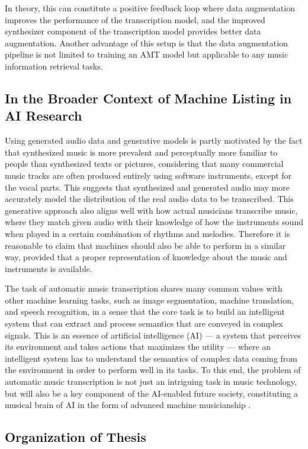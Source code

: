 In theory, this can constitute a positive feedback loop where data augmentation improves the performance of the transcription model, and the improved synthesizer component of the transcription model provides better data augmentation.
Another advantage of this setup is that the data augmentation pipeline is not limited to training an AMT model but applicable to any music information retrieval tasks.

\subsection{In the Broader Context of Machine Listing in AI Research}

Using generated audio data and generative models is partly motivated by the fact that synthesized music is more prevalent and perceptually more familiar to people than synthesized texts or pictures, considering that many commercial music tracks are often produced entirely using software instruments, except for the vocal parts.
This suggests that synthesized and generated audio may more accurately model the distribution of the real audio data to be transcribed.
This generative approach also aligns well with how actual musicians transcribe music, where they match given audio with their knowledge of how the instruments sound when played in a certain combination of rhythms and melodies.
Therefore it is reasonable to claim that machines should also be able to perform in a similar way, provided that a proper representation of knowledge about the music and instruments is available.

The task of automatic music transcription shares many common values with other machine learning tasks, such as image segmentation, machine translation, and speech recognition, in a sense that the core task is to build an intelligent system that can extract and process semantics that are conveyed in complex signals.
This is an essence of artificial intelligence (AI)
--- a system that perceives its environment and takes actions that maximizes the utility \cite{russell2009ai} --- 
where an intelligent system has to understand the semantics of complex data coming from the environment in order to perform well in its tasks.
To this end, the problem of automatic music transcription is not just an intriguing task in music technology, but will also be a key component of the AI-enabled future society, constituting a musical brain of AI in the form of advanced machine musicianship \cite{rowe2003musicianship}.


\subsection{Organization of Thesis}


